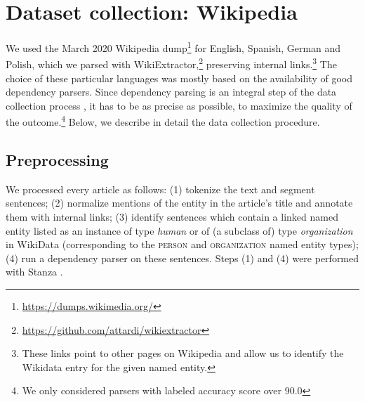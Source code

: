 \documentclass[11pt]{article}
\newcommand{\yktodo}[1]{\todo[color=green!20]{#1}}
\newcommand{\dltodo}[1]{\todo[color=yellow!20]{#1}}
\newcommand{\jttodo}[1]{\todo[color=blue!20]{#1}}
\begin{document}
\section{Dataset collection: Wikipedia}
\label{sec:silver_data}
We used the March 2020 Wikipedia dump\footnote{\url{https://dumps.wikimedia.org/}} for English, Spanish, German and Polish, which we parsed with WikiExtractor,\footnote{\url{https://github.com/attardi/wikiextractor}} preserving internal links.\footnote{These links point to other pages on Wikipedia and allow us to identify the Wikidata entry for the given named entity.} The choice of these particular languages was mostly based on the availability of good dependency parsers. Since dependency parsing is an integral step of the data collection process \cite{kang2019pomo}, it has to be as precise as possible, to maximize the quality of the outcome.\footnote{We only considered parsers with labeled accuracy score over $90.0$}  Below, we describe in detail the data collection procedure. 

\subsection{Preprocessing}
We processed every article as follows: 
(1) tokenize the text and segment sentences; %
(2) normalize mentions of the entity in the article's title and annotate them with internal links; (3) identify sentences which contain a linked named entity listed as an instance of type \textit{human} or of (a subclass of) type \textit{organization} in WikiData (corresponding to the \textsc{person} and \textsc{organization} named entity types); 
(4) run a dependency parser 
on these sentences. 
Steps (1) and (4) were performed with Stanza \cite{qi2020stanza}.
\end{document}
